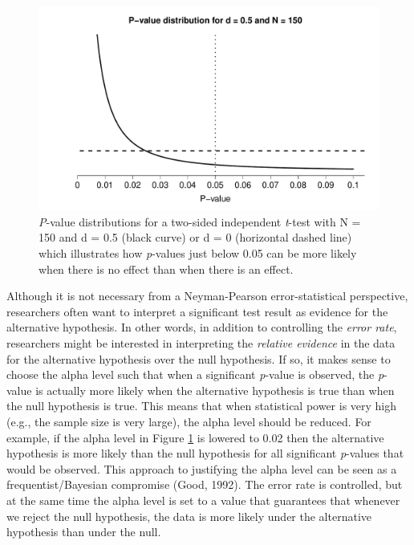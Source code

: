 \documentclass[
  english,
  ,man, a4paper,floatsintext]{apa6}
\begin{document}
\begin{figure}
\centering
\includegraphics{Justify_in_Practice_files/figure-latex/p-plot-1.pdf}
\caption{\label{fig:p-plot}\emph{P}-value distributions for a two-sided independent \emph{t}-test with N = 150 and d = 0.5 (black curve) or d = 0 (horizontal dashed line) which illustrates how \emph{p}-values just below 0.05 can be more likely when there is no effect than when there is an effect.}
\end{figure}

Although it is not necessary from a Neyman-Pearson error-statistical perspective, researchers often want to interpret a significant test result as evidence for the alternative hypothesis. In other words, in addition to controlling the \emph{error rate}, researchers might be interested in interpreting the \emph{relative evidence} in the data for the alternative hypothesis over the null hypothesis. If so, it makes sense to choose the alpha level such that when a significant \emph{p}-value is observed, the \emph{p}-value is actually more likely when the alternative hypothesis is true than when the null hypothesis is true. This means that when statistical power is very high (e.g., the sample size is very large), the alpha level should be reduced. For example, if the alpha level in Figure \ref{fig:p-plot} is lowered to 0.02 then the alternative hypothesis is more likely than the null hypothesis for all significant \emph{p}-values that would be observed. This approach to justifying the alpha level can be seen as a frequentist/Bayesian compromise (Good, 1992). The error rate is controlled, but at the same time the alpha level is set to a value that guarantees that whenever we reject the null hypothesis, the data is more likely under the alternative hypothesis than under the null.
\end{document}
